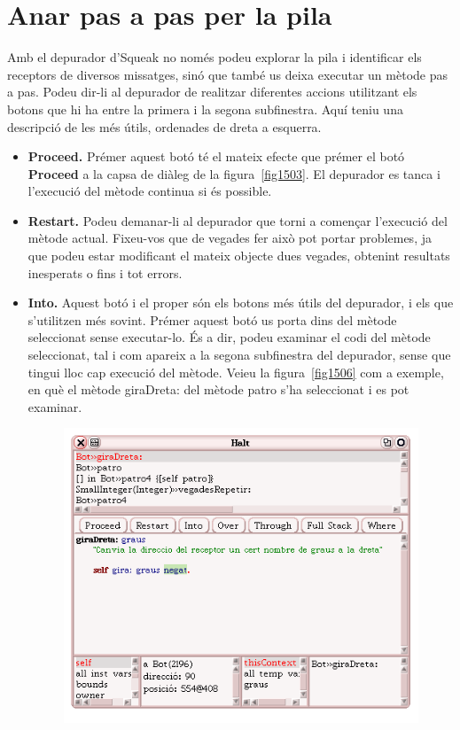 \section{Anar pas a pas per la pila}
Amb el depurador d'Squeak no només podeu explorar la pila i identificar els receptors de diversos missatges, sinó que també us deixa executar un mètode pas a pas. Podeu dir-li al depurador de realitzar diferentes accions utilitzant els botons que hi ha entre la primera i la segona subfinestra. Aquí teniu una descripció de les més útils, ordenades de dreta a esquerra.  
\begin{itemize}
\item[] \textbf{Proceed.} Prémer aquest botó té el mateix efecte que prémer el botó \textbf{Proceed} a la capsa de diàleg de la figura~\ref{fig1503}. El depurador es tanca i l'execució del mètode continua si és possible.
\item[] \textbf{Restart.} Podeu demanar-li al depurador que torni a començar l'execució del mètode actual. Fixeu-vos que de vegades fer això pot portar problemes, ja que podeu estar modificant el mateix objecte dues vegades, obtenint resultats inesperats o fins i tot errors.
\item[] \textbf{Into.} Aquest botó i el proper són els botons més útils del depurador, i els que s'utilitzen més sovint. Prémer aquest botó us porta dins del mètode seleccionat sense executar-lo. És a dir, podeu examinar el codi del mètode seleccionat, tal i com apareix a la segona subfinestra del depurador, sense que tingui lloc cap execució del mètode. Veieu la figura~\ref{fig1506} com a exemple, en què el mètode \textsf{giraDreta:} del mètode \textsf{patro} s'ha seleccionat i es pot examinar.
\begin{figure}[h!]
\begin{center}
\includegraphics[scale=0.4]{Imatges/figura15-6.png}

\end{center}
\end{figure}
\end{itemize}
